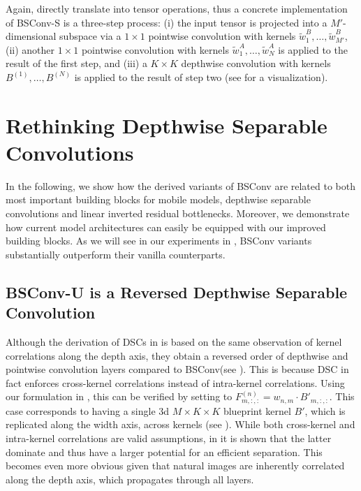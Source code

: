 \documentclass[10pt,twocolumn,letterpaper]{article}
\newcommand{\DCCK}{BSConv\xspace}
\newcommand{\DCCKU}{\DCCK-U\xspace}
\newcommand{\DCCKS}{\DCCK-S\xspace}
\newcommand{\filter}[1]{F^{(#1)}}
\newcommand{\blueprint}[1]{B^{(#1)}}
\newcommand{\blueprintWidthwise}{B'}
\newcommand{\weight}{w}
\newcommand{\weightAArray}{\tilde{w}^A}
\newcommand{\weightBArray}{\tilde{w}^B}
\newcommand{\spatialK}{K}
\newcommand{\channelInCount}{M}
\newcommand{\channelInIndex}{m}
\newcommand{\channelOutCount}{N}
\newcommand{\channelOutIndex}{n}
\begin{document}
Again,  directly translate into tensor operations, thus a concrete implementation of \DCCKS is a three-step process:
(i) the input tensor is projected into a $\channelInCount'$-dimensional subspace via a $1 \times 1$ pointwise convolution with kernels $\weightBArray_1, \dots, \weightBArray_{\channelInCount'}$,
(ii) another $1 \times 1$ pointwise convolution with kernels $\weightAArray_1, \dots, \weightAArray_{\channelOutCount}$ is applied to the result of the first step, and
(iii) a $\spatialK \times \spatialK$ depthwise convolution with kernels $\blueprint{1}, \dots, \blueprint{\channelOutCount}$ is applied to the result of step two (see  for a visualization).





\section{Rethinking Depthwise Separable Convolutions}
\label{sec:dcck:mobilenets}
In the following, we show how the derived variants of \DCCK are related to both most important building blocks for mobile models, \ie depthwise separable convolutions and linear inverted residual bottlenecks.
Moreover, we demonstrate how current model architectures can easily be equipped with our improved building blocks.
As we will see in our experiments in , \DCCK variants substantially outperform their vanilla counterparts.

\subsection{\DCCKU is a Reversed Depthwise Separable Convolution}
\label{sec:dcck:mobilenets:dcck-u}

Although the derivation of DSCs in \cite{sifre2014rigid} is based on the same observation of kernel correlations along the depth axis, they obtain a reversed order of depthwise and pointwise convolution layers compared to \DCCK (see ).
This is because DSC in fact enforces cross-kernel correlations instead of intra-kernel correlations.
Using our formulation in , this can be verified by setting  to $\filter{\channelOutIndex}_{\channelInIndex, :, :} = \weight_{\channelOutIndex, \channelInIndex} \cdot \blueprintWidthwise_{\channelInIndex, :, :}$.
This case corresponds to having a single 3d $\channelInCount \times \spatialK \times \spatialK$ blueprint kernel $\blueprintWidthwise$, which is replicated along the width axis, \ie across kernels (see ).
While both cross-kernel and intra-kernel correlations are valid assumptions, in \cite{guo2018network} it is shown that the latter dominate and thus have a larger potential for an efficient separation.
This becomes even more obvious given that natural images are inherently correlated along the depth axis, which propagates through all layers.
\end{document}

